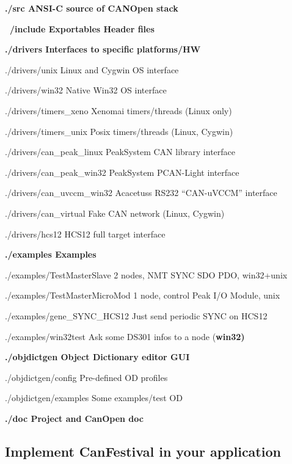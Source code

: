 \documentclass[12pt,twoside]{article}
\begin{document}
{\ttfamily\bfseries
./src ANSI{}-C source of CANOpen stack}

{\ttfamily\bfseries
\ /include Exportables Header files}

{\ttfamily\bfseries
./drivers Interfaces to specific platforms/HW}

{\ttfamily
./drivers/unix Linux and Cygwin OS interface}

{\ttfamily
./drivers/win32 Native Win32 OS interface}

{\ttfamily
./drivers/timers\_xeno Xenomai timers/threads (Linux only)}

{\ttfamily
./drivers/timers\_unix Posix timers/threads (Linux, Cygwin)}

{\ttfamily
./drivers/can\_peak\_linux PeakSystem CAN library interface}

{\ttfamily
./drivers/can\_peak\_win32 PeakSystem PCAN{}-Light interface}

{\ttfamily
./drivers/can\_uvccm\_win32 Acacetus{\textquotesingle}s RS232
``CAN{}-uVCCM'' interface}

{\ttfamily
./drivers/can\_virtual Fake CAN network (Linux, Cygwin)}

{\ttfamily
./drivers/hcs12 HCS12 full target interface}

{\ttfamily\bfseries
./examples Examples}

{\ttfamily
./examples/TestMasterSlave 2 nodes, NMT SYNC SDO PDO, win32+unix}

{\ttfamily
./examples/TestMasterMicroMod 1 node, control Peak I/O Module, unix}

{\ttfamily
./examples/gene\_SYNC\_HCS12 Just send periodic SYNC on HCS12}

{\ttfamily
./examples/win32test Ask some DS301 infos to a node (\textbf{win32)}}

{\ttfamily\bfseries
./objdictgen Object Dictionary editor GUI}

{\ttfamily
./objdictgen/config Pre{}-defined OD profiles}

{\ttfamily
./objdictgen/examples Some examples/test OD}

{\ttfamily\bfseries
./doc Project and CanOpen doc}

\subsection{Implement CanFestival in your application}
 
\end{document}
